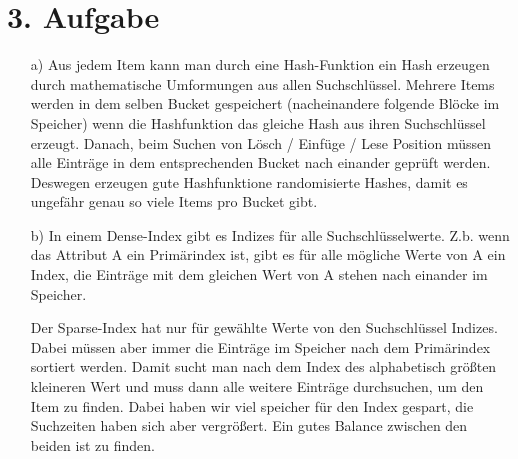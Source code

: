 \section*{3. Aufgabe}

\begin{enumerate}

    \item[a)]
    Aus jedem Item kann man durch eine Hash-Funktion ein Hash erzeugen durch mathematische Umformungen aus allen Suchschlüssel. Mehrere Items werden in dem selben Bucket gespeichert (nacheinandere folgende Blöcke im Speicher) wenn die Hashfunktion das gleiche Hash aus ihren Suchschlüssel erzeugt. Danach, beim Suchen von Lösch / Einfüge / Lese Position müssen alle Einträge in dem entsprechenden Bucket nach einander geprüft werden. Deswegen erzeugen gute Hashfunktione randomisierte Hashes, damit es ungefähr genau so viele Items pro Bucket gibt.

    \item[b)]
    In einem Dense-Index gibt es Indizes für alle Suchschlüsselwerte. Z.b. wenn das Attribut A ein Primärindex ist, gibt es für alle mögliche Werte von A ein Index, die Einträge mit dem gleichen Wert von A stehen nach einander im Speicher.

    Der Sparse-Index hat nur für gewählte Werte von den Suchschlüssel Indizes. Dabei müssen aber immer die Einträge im Speicher nach dem Primärindex sortiert werden. Damit sucht man nach dem Index des alphabetisch größten kleineren Wert und muss dann alle weitere Einträge durchsuchen, um den Item zu finden. Dabei haben wir viel speicher für den Index gespart, die Suchzeiten haben sich aber vergrößert. Ein gutes Balance zwischen den beiden ist zu finden.

\end{enumerate}


